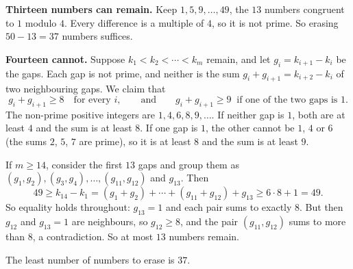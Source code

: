 \textbf{Thirteen numbers can remain.} Keep $1,5,9,\dots,49$, the $13$ numbers congruent to $1$ modulo $4$. Every difference is a multiple of $4$, so it is not prime. So erasing $50-13=37$ numbers suffices.

\textbf{Fourteen cannot.} Suppose $k_1<k_2<\cdots<k_m$ remain, and let $g_i=k_{i+1}-k_i$ be the gaps. Each gap is not prime, and neither is the sum $g_i+g_{i+1}=k_{i+2}-k_i$ of two neighbouring gaps. We claim that
\[
g_i+g_{i+1}\ge8\quad\text{for every }i,\qquad\text{and}\qquad g_i+g_{i+1}\ge9\ \text{ if one of the two gaps is }1 .
\]
The non-prime positive integers are $1,4,6,8,9,\dots$. If neither gap is $1$, both are at least $4$ and the sum is at least $8$. If one gap is $1$, the other cannot be $1$, $4$ or $6$ (the sums $2$, $5$, $7$ are prime), so it is at least $8$ and the sum is at least $9$.

If $m\ge14$, consider the first $13$ gaps and group them as $(g_1,g_2),(g_3,g_4),\dots,(g_{11},g_{12})$ and $g_{13}$. Then
\[
49\ge k_{14}-k_1=(g_1+g_2)+\cdots+(g_{11}+g_{12})+g_{13}\ge6\cdot8+1=49 .
\]
So equality holds throughout: $g_{13}=1$ and each pair sums to exactly $8$. But then $g_{12}$ and $g_{13}=1$ are neighbours, so $g_{12}\ge8$, and the pair $(g_{11},g_{12})$ sums to more than $8$, a contradiction. So at most $13$ numbers remain.

The least number of numbers to erase is $\boxed{37}$.
